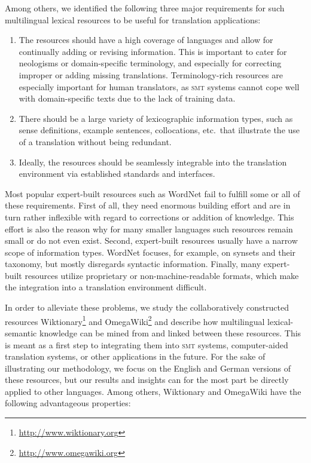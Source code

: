 \documentclass[output=paper]{LSP/langsci}
\begin{document}
Among others, we identified the following three major requirements for such multilingual lexical resources to be useful for translation applications:

\begin{enumerate}
  \item The resources should have a high coverage of languages and allow for continually adding or revising information. This is important to cater for neologisms or domain-specific terminology, and especially for correcting improper or adding missing translations. Terminology-rich resources are especially important for human translators, as \textsc{smt} systems cannot cope well with domain-specific texts due to the lack of training data.
  \item There should be a large variety of lexicographic information types, such as sense definitions, example sentences, collocations, etc.\ that illustrate the use of a translation without being redundant. 
  \item Ideally, the resources should be seamlessly integrable into the translation environment via established standards and interfaces. 
\end{enumerate}

Most popular expert-built resources such as WordNet \citep{Fellbaum98} fail to fulfill some or all of these requirements. First of all, they need enormous building effort and are in turn rather inflexible with regard to corrections or addition of knowledge. This effort is also the reason why for many smaller languages such resources remain small or do not even exist.  Second, expert-built resources usually have a narrow scope of information types. WordNet focuses, for example, on synsets and their taxonomy, but mostly disregards syntactic information. Finally, many expert-built resources utilize proprietary or non-machine-readable formats, which make the integration into a translation environment difficult.

\noindent

In order to alleviate these problems, we study the collaboratively constructed resources Wiktionary\footnote{\url{http://www.wiktionary.org}} and OmegaWiki\footnote{\url{http://www.omegawiki.org}} and describe how multilingual lexical-semantic knowledge can be mined from and linked between these resources. This is meant as a first step to integrating them into \textsc{smt} systems, computer-aided translation
 systems, or other applications in the future. For the sake of illustrating our methodology, we focus on the English and German versions of these resources, but our results and insights can for the most part be directly applied to other languages. Among others, Wiktionary and OmegaWiki have the following advantageous properties:
\end{document}
